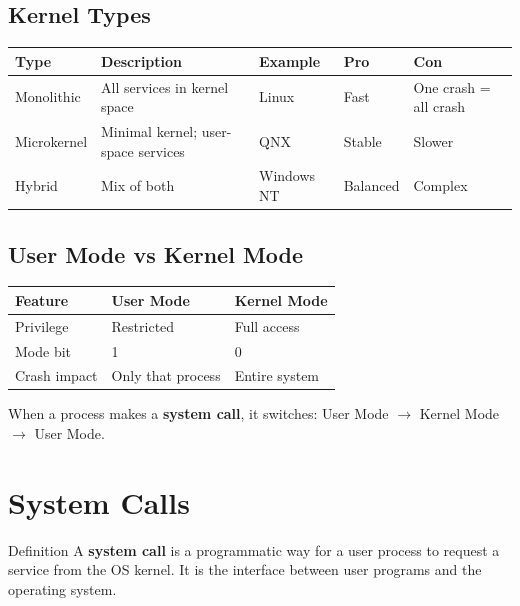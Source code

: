 \documentclass[12pt,a4paper]{article}
\begin{document}
\subsection{Kernel Types}
\begin{center}
\begin{tabular}{@{} l p{4cm} l l l @{}}
\toprule
\textbf{Type} & \textbf{Description} & \textbf{Example} & \textbf{Pro} & \textbf{Con} \\
\midrule
Monolithic & All services in kernel space & Linux & Fast & One crash = all crash \\
Microkernel & Minimal kernel; user-space services & QNX & Stable & Slower \\
Hybrid & Mix of both & Windows NT & Balanced & Complex \\
\bottomrule
\end{tabular}
\end{center}

\subsection{User Mode vs Kernel Mode}
\begin{center}
\begin{tabular}{@{} l l l @{}}
\toprule
\textbf{Feature} & \textbf{User Mode} & \textbf{Kernel Mode} \\
\midrule
Privilege & Restricted & Full access \\
Mode bit & 1 & 0 \\
Crash impact & Only that process & Entire system \\
\bottomrule
\end{tabular}
\end{center}
When a process makes a \textbf{system call}, it switches: User Mode $\rightarrow$ Kernel Mode $\rightarrow$ User Mode.

\section{System Calls}

\begin{conceptbox}{Definition}
A \textbf{system call} is a programmatic way for a user process to request a service from the OS kernel. It is the interface between user programs and the operating system.
\end{conceptbox}
\end{document}
